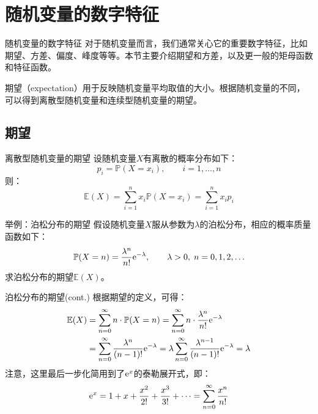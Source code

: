 \documentclass[t]{beamer}
\renewcommand{\Pr}{\mathbb{P}}
\newcommand{\E}{\mathbb{E}}
\begin{document}
  \section{随机变量的数字特征}

  \begin{frame}{随机变量的数字特征}
    对于随机变量而言，我们通常关心它的重要数字特征，比如期望、方差、偏度、峰度等等。本节主要介绍期望和方差，以及更一般的矩母函数和特征函数。
  
    期望（expectation）用于反映随机变量平均取值的大小。根据随机变量的不同，可以得到离散型随机变量和连续型随机变量的期望。
  \end{frame}

  \subsection{期望}
  \begin{frame}{离散型随机变量的期望}
    设随机变量$X$有离散的概率分布如下：
    \begin{equation*}p_i=\Pr(X=x_i),\qquad i=1,\ldots
    ,n\end{equation*}
    则：\begin{equation*}\E(X)=\sum_{i=1}^{n}
    x_i\Pr(X=x_i)=\sum_{i=1}^{n} x_i p_i \end{equation*}
  \end{frame}
  
  \begin{frame}{举例：泊松分布的期望}
    假设随机变量$X$服从参数为$\lambda$的泊松分布，相应的概率质量函数如下：
    \begin{equation*}\Pr(X=n)=\frac{\lambda^n}{n!}{\rm
    e}^{-\lambda}, \qquad \lambda>0, \;n=0,1,2,\ldots\end{equation*}
    求泊松分布的期望$\E(X)$。
  \end{frame}



  \begin{frame}{泊松分布的期望(cont.)}
    根据期望的定义，可得：
    \begin{equation*}\begin{split}
    \E(X)&=\sum_{n=0}^{\infty} n\cdot \Pr(X=n)=\sum_{n=0}^{\infty}
    n\cdot \frac{\lambda^n}{n!}{\rm e}^{-\lambda}\\
    &=\sum_{n=0}^{\infty} \frac{\lambda^n}{(n-1)!}{\rm
    e}^{-\lambda}=\lambda \sum_{n=0}^{\infty}
    \frac{\lambda^{n-1}}{(n-1)!}{\rm e}^{-\lambda}=\lambda
    \end{split} \end{equation*}
    注意，这里最后一步化简用到了${\rm e}^x$的泰勒展开式，即：
    \begin{equation*}{\rm
    e}^x=1+x+\frac{x^2}{2!}+\frac{x^3}{3!}+\cdots
    =\sum^{\infty}_{n=0}\frac{x^n}{n!} \end{equation*}
  \end{frame}
\end{document}
